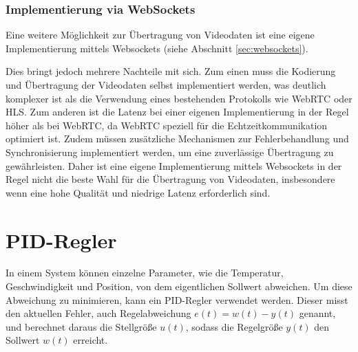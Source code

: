         \subsubsection{Implementierung via WebSockets}
        Eine weitere Möglichkeit zur Übertragung von Videodaten ist eine eigene Implementierung mittels Websockets (siehe Abschnitt \ref{sec:websockets}). 

        Dies bringt jedoch mehrere Nachteile mit sich. Zum einen muss die Kodierung und Übertragung der Videodaten selbst implementiert werden, was deutlich komplexer ist als die Verwendung eines bestehenden Protokolls wie \ac{WebRTC} oder \ac{HLS}. Zum anderen ist die Latenz bei einer eigenen Implementierung in der Regel höher als bei \ac{WebRTC}, da \ac{WebRTC} speziell für die Echtzeitkommunikation optimiert ist. Zudem müssen zusätzliche Mechanismen zur Fehlerbehandlung und Synchronisierung implementiert werden, um eine zuverlässige Übertragung zu gewährleisten. Daher ist eine eigene Implementierung mittels Websockets in der Regel nicht die beste Wahl für die Übertragung von Videodaten, insbesondere wenn eine hohe Qualität und niedrige Latenz erforderlich sind.


\section{PID-Regler} \label{sec:pid_regler}
In einem System können einzelne Parameter, wie die Temperatur, Geschwindigkeit und Position, von dem eigentlichen Sollwert abweichen. Um diese Abweichung zu minimieren, kann ein PID-Regler verwendet werden. Dieser misst den aktuellen Fehler, auch Regelabweichung $e(t) = w(t) - y(t)$ genannt, und berechnet daraus die Stellgröße $u(t)$, sodass die Regelgröße $y(t)$ den Sollwert $w(t)$ erreicht.

